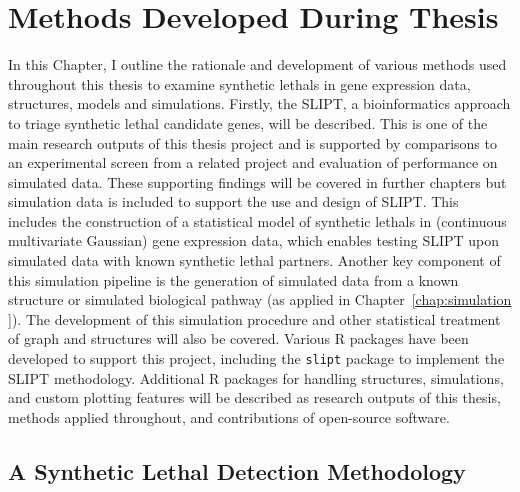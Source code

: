 \chapter{Methods Developed During Thesis}
\label{chap:methods_dev}

In this Chapter, I outline the rationale and development of various methods used throughout this thesis to examine \glspl{synthetic lethal} in \gls{gene expression} data,  structures, models and simulations. Firstly, the \acrfull{SLIPT}, a \gls{bioinformatics} approach to triage \gls{synthetic lethal} candidate genes, will be described. This is one of the main research outputs of this thesis project and is supported by comparisons to an experimental screen from a related project and evaluation of performance on simulated data. These supporting findings will be covered in further chapters but simulation data is included to support the use and design of \gls{SLIPT}. This includes the construction of a statistical model of \glspl{synthetic lethal} in (continuous multivariate Gaussian) \gls{gene expression} data, which enables testing \gls{SLIPT} upon simulated data with known \gls{synthetic lethal} partners. Another key component of this simulation pipeline is the generation of simulated data from a known  structure or simulated biological pathway (as applied in Chapter~\ref{chap:simulation
}). The development of this simulation procedure and other statistical treatment of graph and  structures will also be covered. Various R packages have been developed to support this project, including the \texttt{slipt} package to implement the \gls{SLIPT} methodology. Additional R packages for handling  structures, simulations, and custom plotting features will be described as research outputs of this thesis, methods applied throughout, and contributions of open-source software.

\section{A Synthetic Lethal Detection Methodology} \label{methods:SLIPT}

